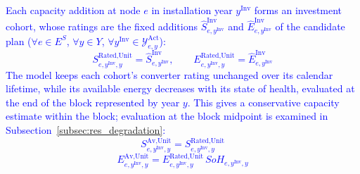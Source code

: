 \textcolor{blue}{
    Each capacity addition at node $e$ in installation year $y^{\text{Inv}}$ forms an investment cohort, whose ratings are the fixed additions $\hat{S}^{\text{Inv}}_{e,y^{\text{Inv}}}$ and $\hat{E}^{\text{Inv}}_{e,y^{\text{Inv}}}$ of the candidate plan ($\forall e\in E^S$, $\forall y\in Y$, $\forall y^{\text{Inv}}\in\mathcal{Y}^{\text{Act}}_{e,y}$):
}
\textcolor{blue}{
    \begin{equation}
        S^{\text{Rated,Unit}}_{e,y^\text{Inv},y} = \hat{S}^{\text{Inv}}_{e,y^\text{Inv}}, \qquad
        E^{\text{Rated,Unit}}_{e,y^\text{Inv},y} = \hat{E}^{\text{Inv}}_{e,y^\text{Inv}}
        \label{eq:cohort_rated}
    \end{equation}
}
\textcolor{blue}{
    The model keeps each cohort's converter rating unchanged over its calendar lifetime, while its available energy decreases with its state of health, evaluated at the end of the block represented by year $y$. This gives a conservative capacity estimate within the block; evaluation at the block midpoint is examined in Subsection~\ref{subsec:res_degradation}:
}
\textcolor{blue}{
    \begin{equation}
        S^{\text{Av,Unit}}_{e,y^\text{Inv},y} = S^{\text{Rated,Unit}}_{e,y^\text{Inv},y}
        \label{eq:cohort_available}
    \end{equation}
    \begin{equation}
        E^{\text{Av,Unit}}_{e,y^\text{Inv},y} = E^{\text{Rated,Unit}}_{e,y^\text{Inv},y}\, SoH_{e,y^\text{Inv},y}
        \label{eq:cohort_available_energy}
    \end{equation}
}

